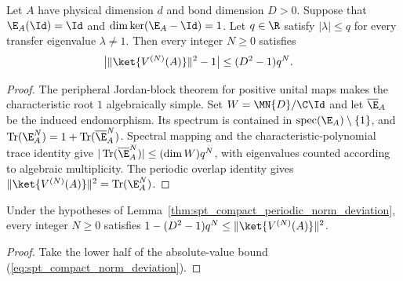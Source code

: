 \begin{lemma}
    \label{thm:spt_compact_periodic_norm_deviation}
    \leanok
    Let $A$ have physical dimension $d$ and bond dimension $D>0$.
    Suppose that $\E_A(\Id)=\Id$ and $\dim\ker(\E_A-\Id)=1$.
    Let $q\in\R$ satisfy $|\lambda|\leq q$ for every transfer eigenvalue
    $\lambda\ne1$. Then every integer $N\geq0$ satisfies
    \begin{align}
        \bigl|\|\ket{V^{(N)}(A)}\|^2-1\bigr|
         & \leq (D^2-1)q^N.
        \label{eq:spt_compact_norm_deviation}
    \end{align}
\end{lemma}
\begin{proof}\leanok
    The peripheral Jordan-block theorem for positive unital maps
    \cite[Proposition~6.2]{Wolf2012Quantum} makes the characteristic root
    $1$ algebraically simple. Set $W=\MN{D}/\C\Id$ and let
    $\overline{\E}_A$ be the induced endomorphism. Its spectrum is contained
    in $\operatorname{spec}(\E_A)\setminus\{1\}$, and
    $\operatorname{Tr}(\E_A^N)=1+\operatorname{Tr}(\overline{\E}_A^N)$.
    Spectral mapping and the characteristic-polynomial trace identity give
    $|\operatorname{Tr}(\overline{\E}_A^N)|\leq(\dim W)q^N$,
    with eigenvalues counted according to algebraic multiplicity.
    The periodic overlap identity gives
    $\|\ket{V^{(N)}(A)}\|^2=\operatorname{Tr}(\E_A^N)$.
\end{proof}

\begin{lemma}
    \label{thm:spt_compact_periodic_norm_lower}
    \leanok
    Under the hypotheses of
    Lemma~\ref{thm:spt_compact_periodic_norm_deviation}, every integer
    $N\geq0$ satisfies
    $1-(D^2-1)q^N\leq\|\ket{V^{(N)}(A)}\|^2$.
\end{lemma}
\begin{proof}\leanok
    Take the lower half of the absolute-value bound
    (\ref{eq:spt_compact_norm_deviation}).
\end{proof}

